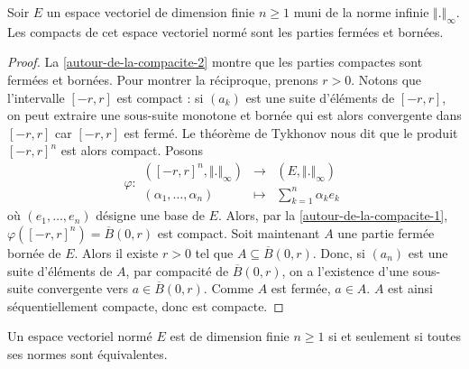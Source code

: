 	\begin{proposition}
		\label{autour-de-la-compacite-3}
		Soir $E$ un espace vectoriel de dimension finie $n \geq 1$ muni de la norme infinie $\Vert . \Vert_\infty$. Les compacts de cet espace vectoriel normé sont les parties fermées et bornées.
	\end{proposition}
	
	\begin{proof}
		La \cref{autour-de-la-compacite-2} montre que les parties compactes sont fermées et bornées. Pour montrer la réciproque, prenons $r > 0$. Notons que l'intervalle $[-r,r]$ est compact : si $(a_k)$ est une suite d'éléments de $[-r,r]$, on peut extraire une sous-suite monotone et bornée qui est alors convergente dans $[-r,r]$ car $[-r,r]$ est fermé. Le théorème de Tykhonov nous dit que le produit $[-r,r]^n$ est alors compact.
		\newpar
		Posons
		\[
			\varphi :
			\begin{array}{ccc}
				([-r, r]^n, \Vert . \Vert_\infty) &\rightarrow& (E, \Vert . \Vert_\infty) \\
				(\alpha_1, \dots, \alpha_n) &\mapsto& \sum_{k=1}^n \alpha_k e_k
			\end{array}
		\]
		où $(e_1, \dots, e_n)$ désigne une base de $E$. Alors, par la \cref{autour-de-la-compacite-1}, $\varphi([-r, r]^n) = \overline{B}(0,r)$ est compact.
		\newpar
		Soit maintenant $A$ une partie fermée bornée de $E$. Alors il existe $r > 0$ tel que $A \subseteq \overline{B}(0,r)$. Donc, si $(a_n)$ est une suite d'éléments de $A$, par compacité de $\overline{B}(0,r)$, on a l'existence d'une sous-suite convergente vers $a \in \overline{B}(0,r)$. Comme $A$ est fermée, $a \in A$. $A$ est ainsi séquentiellement compacte, donc est compacte.
	\end{proof}
	
	\begin{theorem}
		\label{autour-de-la-compacite-4}
		Un espace vectoriel normé $E$ est de dimension finie $n \geq 1$ si et seulement si toutes ses normes sont équivalentes. 
	\end{theorem}
	
